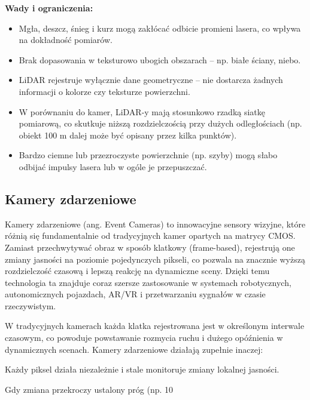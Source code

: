 \documentclass[magisterska]{pracadypl}
\begin{document}
\begin{minipage}[t]{\textwidth}
\textbf{Wady i ograniczenia:}
\begin{itemize}
  \item Mgła, deszcz, śnieg i kurz mogą zakłócać odbicie promieni lasera, co wpływa na dokładność pomiarów.

  \item Brak dopasowania w teksturowo ubogich obszarach – np. białe ściany, niebo.

  \item LiDAR rejestruje wyłącznie dane geometryczne – nie dostarcza żadnych informacji o kolorze czy teksturze powierzchni.

  \item W porównaniu do kamer, LiDAR-y mają stosunkowo rzadką siatkę pomiarową, co skutkuje niższą rozdzielczością przy dużych odległościach (np. obiekt 100 m dalej może być opisany przez kilka punktów).

  \item Bardzo ciemne lub przezroczyste powierzchnie (np. szyby) mogą słabo odbijać impulsy lasera lub w ogóle je przepuszczać.
\end{itemize}
\end{minipage}

\subsection{Kamery zdarzeniowe}

Kamery zdarzeniowe (ang. Event Cameras) to innowacyjne sensory wizyjne, które różnią się fundamentalnie od tradycyjnych kamer opartych na matrycy CMOS. Zamiast przechwytywać obraz w sposób klatkowy (frame-based), rejestrują one zmiany jasności na poziomie pojedynczych pikseli, co pozwala na znacznie wyższą rozdzielczość czasową i lepszą reakcję na dynamiczne sceny. Dzięki temu technologia ta znajduje coraz szersze zastosowanie w systemach robotycznych, autonomicznych pojazdach, AR/VR i przetwarzaniu sygnałów w czasie rzeczywistym.

W tradycyjnych kamerach każda klatka rejestrowana jest w określonym interwale czasowym, co powoduje powstawanie rozmycia ruchu i dużego opóźnienia w dynamicznych scenach. Kamery zdarzeniowe działają zupełnie inaczej:

Każdy piksel działa niezależnie i stale monitoruje zmiany lokalnej jasności.

Gdy zmiana przekroczy ustalony próg (np. 10%
\end{document}
